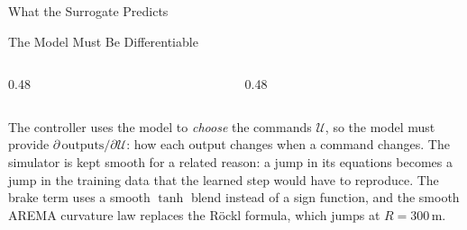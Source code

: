 \begin{frame}{What the Surrogate Predicts}
  \vspace{0.4em}
  \centering

  \vspace{1.1em}
  \begin{minipage}{0.90\textwidth}\small
  \end{minipage}
\end{frame}

\begin{frame}{The Model Must Be Differentiable}
  \vspace{0.2em}
  \begin{columns}[T,onlytextwidth]
    \begin{column}{0.48\textwidth}
      \brakeBlendChart
    \end{column}
    \begin{column}{0.48\textwidth}
      \curvatureChart
    \end{column}
  \end{columns}

  \vspace{0.3em}
  \begin{minipage}{0.94\textwidth}\footnotesize
    The controller uses the model to \emph{choose} the commands $\mathcal{U}$, so
    the model must provide $\partial\,\text{outputs}/\partial\mathcal{U}$: how
    each output changes when a command changes. The simulator is kept
    \alert{smooth for a related reason}: a jump in its equations becomes a jump
    in the training data that the learned step would have to reproduce. The
    brake term uses a smooth $\tanh$ blend instead of a sign function, and the
    smooth AREMA curvature law replaces the R\"ockl formula, which jumps at
    $R = 300$\,m.
  \end{minipage}
\end{frame}

